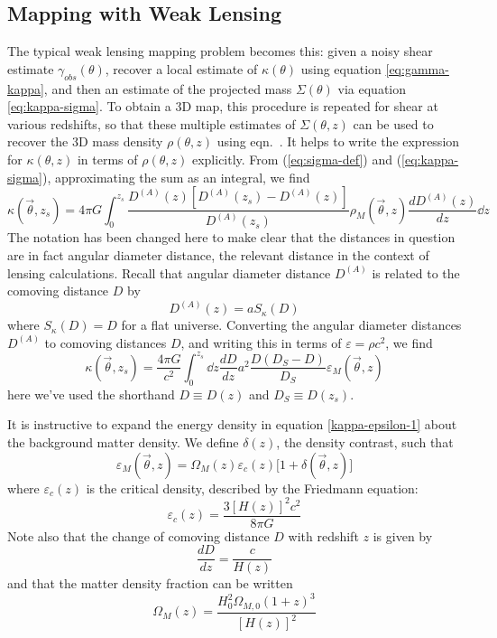 \subsection{Mapping with Weak Lensing}
The typical weak lensing mapping problem becomes this:
given a noisy shear estimate $\gamma_{obs}(\theta)$, recover a local
estimate of $\kappa(\theta)$ using equation \ref{eq:gamma-kappa},
and then an estimate 
of the projected mass $\Sigma(\theta)$ via equation \ref{eq:kappa-sigma}.
To obtain  a 3D map, this procedure is repeated for shear at various
redshifts, so that these multiple estimates of $\Sigma(\theta, z)$ can
be used to recover the 3D mass density $\rho(\theta, z)$ using
eqn.~\label{eq:sigma-def}.  It helps to write 
the expression for $\kappa(\theta,z)$ in terms of $\rho(\theta,z)$
explicitly.  From (\ref{eq:sigma-def}) and (\ref{eq:kappa-sigma}),
approximating the sum as an integral, we find
\begin{equation}
  \kappa(\vec{\theta},z_s) 
  = 4\pi G \int_0^{z_s} 
  \frac{D^{(A)}(z)[D^{(A)}(z_s)-D^{(A)}(z)]}{D^{(A)}(z_s)} 
  \rho_M(\vec{\theta},z) \frac{dD^{(A)}(z)}{dz} \dd z
\end{equation}
The notation has been changed here to make clear that the distances in 
question are in fact angular diameter distance, the relevant distance 
in the context of lensing calculations.  Recall that angular diameter 
distance $D^{(A)}$ is related to the comoving distance $D$ by
\begin{equation}
  D^{(A)}(z) = a S_\kappa (D)
\end{equation}
where $S_\kappa(D) = D$ for a flat universe.  Converting the angular 
diameter distances $D^{(A)}$ to comoving distances $D$,
and writing this in terms of $\varepsilon = \rho c^2$, we find
\begin{equation}
  \label{kappa-epsilon-1}
  \kappa(\vec{\theta},z_s) 
  = \frac{4\pi G}{c^2} \int_0^{z_s} \dd z\frac{dD}{dz} 
  a^2\frac{D(D_S-D)}{D_S} \varepsilon_M(\vec{\theta},z) 
\end{equation}
here we've used the shorthand $D \equiv D(z)$ and 
$D_S \equiv D(z_s)$.

It is instructive to expand the energy density in equation 
\ref{kappa-epsilon-1} about the background matter density.  
We define $\delta(z)$, the density contrast, such that
\begin{equation}
  \label{delta-def}
  \varepsilon_M(\vec{\theta},z) = \Omega_M(z) \varepsilon_c(z)\Big[1+\delta(\vec{\theta},z)\Big]
\end{equation}
where $\varepsilon_c(z)$ is the critical density, described by the Friedmann equation:
\begin{equation}
  \label{H-def}
  \varepsilon_c(z) = \frac{3 \left[H(z)\right]^2 c^2}{8\pi G}
\end{equation}
Note also that the change of comoving distance $D$ with redshift $z$ is given by
\begin{equation}
  \label{dDdz}
  \frac{dD}{dz} = \frac{c}{H(z)}
\end{equation}
and that the matter density fraction can be written
\begin{equation}
  \Omega_M(z) = \frac{H_0^2\Omega_{M,0}(1+z)^3}{[H(z)]^2}
\end{equation}


